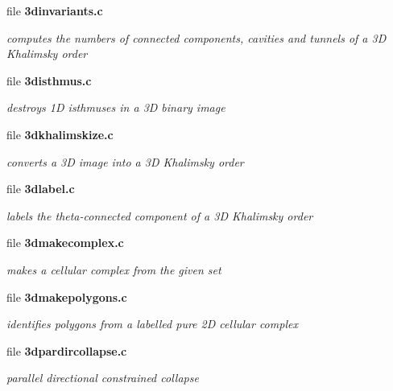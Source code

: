 \begin{CompactItemize}
\item 
file {\bf 3dinvariants.c}
\begin{CompactList}\small\item\em computes the numbers of connected components, cavities and tunnels of a 3D Khalimsky order \item\end{CompactList}

\item 
file {\bf 3disthmus.c}
\begin{CompactList}\small\item\em destroys 1D isthmuses in a 3D binary image \item\end{CompactList}

\item 
file {\bf 3dkhalimskize.c}
\begin{CompactList}\small\item\em converts a 3D image into a 3D Khalimsky order \item\end{CompactList}

\item 
file {\bf 3dlabel.c}
\begin{CompactList}\small\item\em labels the theta-connected component of a 3D Khalimsky order \item\end{CompactList}

\item 
file {\bf 3dmakecomplex.c}
\begin{CompactList}\small\item\em makes a cellular complex from the given set \item\end{CompactList}

\item 
file {\bf 3dmakepolygons.c}
\begin{CompactList}\small\item\em identifies polygons from a labelled pure 2D cellular complex \item\end{CompactList}

\item 
file {\bf 3dpardircollapse.c}
\begin{CompactList}\small\item\em parallel directional constrained collapse \item\end{CompactList}


\end{CompactItemize}
